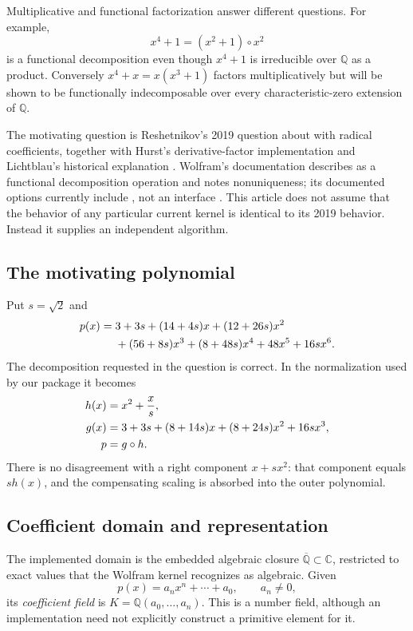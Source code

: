 \documentclass[11pt,a4paper]{article}
\theoremstyle{definition}
\newcommand{\Q}{\mathbb Q}
\newcommand{\C}{\mathbb C}
\newcommand{\code}[1]{\texttt{\detokenize{#1}}}
\begin{document}
Multiplicative and functional factorization answer different questions. For example,
\[
 x^4+1=(x^2+1)\circ x^2
\]
is a functional decomposition even though $x^4+1$ is irreducible over $\Q$ as a product. Conversely $x^4+x=x(x^3+1)$ factors multiplicatively but will be shown to be functionally indecomposable over every characteristic-zero extension of $\Q$.

The motivating question is Reshetnikov's 2019 question about \code{Decompose} with radical coefficients, together with Hurst's derivative-factor implementation and Lichtblau's historical explanation \cite{question}. Wolfram's documentation describes \code{Decompose} as a functional decomposition operation and notes nonuniqueness; its documented options currently include \code{Modulus}, not an \code{Extension} interface \cite{decompose}. This article does not assume that the behavior of any particular current kernel is identical to its 2019 behavior. Instead it supplies an independent algorithm.

\subsection{The motivating polynomial}
Put $s=\sqrt2$ and
\begin{align}
 p(x)={}&3+3s+(14+4s)x+(12+26s)x^2\notag\\
 &+(56+8s)x^3+(8+48s)x^4+48x^5+16sx^6.\label{eq:sample}
\end{align}
The decomposition requested in the question is correct. In the normalization used by our package it becomes
\begin{align}
 h(x)&=x^2+\frac{x}{s},\label{eq:sampleh}\\
 g(x)&=3+3s+(8+14s)x+(8+24s)x^2+16sx^3,\label{eq:sampleg}\\
 p&=g\circ h.\notag
\end{align}
There is no disagreement with a right component $x+sx^2$: that component equals $s h(x)$, and the compensating scaling is absorbed into the outer polynomial.

\subsection{Coefficient domain and representation}
The implemented domain is the embedded algebraic closure $\overline{\Q}\subset\C$, restricted to exact values that the Wolfram kernel recognizes as algebraic. Given
\[
 p(x)=a_nx^n+\cdots+a_0,\qquad a_n\ne0,
\]
its \emph{coefficient field} is $K=\Q(a_0,\ldots,a_n)$. This is a number field, although an implementation need not explicitly construct a primitive element for it.
\end{document}
